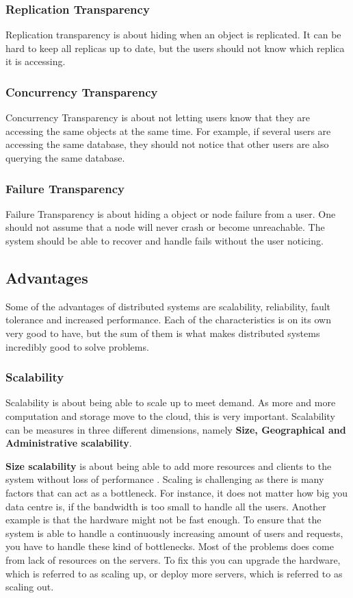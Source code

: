 \subsubsection{Replication Transparency}
Replication transparency is about hiding when an object is replicated. It can be hard to keep all replicas up to date, but the users should not know which replica it is accessing.

\subsubsection{Concurrency Transparency}
Concurrency Transparency is about not letting users know that they are accessing the same objects at the same time. For example, if several users are accessing the same database, they should not notice that other users are also querying the same database.

\subsubsection{Failure Transparency}
Failure Transparency is about hiding a object or node failure from a user. One should not assume that a node will  never crash or become unreachable. The system should be able to recover and handle fails without the user noticing.


\subsection{Advantages}
Some of the advantages of distributed systems are scalability, reliability, fault tolerance and increased performance. Each of the characteristics is on its own very good to have, but the sum of them is what makes distributed systems incredibly good to solve problems. %

\subsubsection{Scalability}
Scalability is about being able to scale up to meet demand. As more and more computation and storage move to the cloud, this is very important. Scalability can be measures in three different dimensions, namely \textbf{Size, Geographical and Administrative scalability}.

\textbf{Size scalability} is about being able to add more resources and clients to the system without loss of performance \cite{steen_distributed_2017}. Scaling is challenging as there is many factors that can act as a bottleneck. For instance, it does not matter how big you data centre is, if the bandwidth  is too small to handle all the users. Another example is that the hardware might not be fast enough. To ensure that the system is able to handle a continuously increasing amount of users and requests, you have to handle these kind of bottlenecks. Most of the problems does come from lack of resources on the servers. To fix this you can upgrade the hardware, which is referred to as scaling up, or deploy more servers, which is referred to as scaling out.

